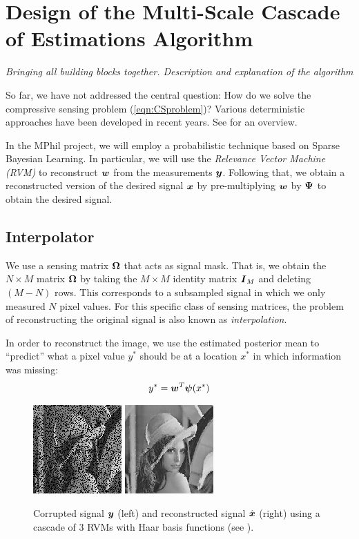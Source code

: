 \chapter{Design of the Multi-Scale Cascade of Estimations Algorithm}
\emph{Bringing all building blocks together. Description and explanation of the algorithm}



So far, we have not addressed the central question: How do we solve the compressive sensing problem (\ref{eqn:CSproblem})?
Various deterministic approaches have been developed in recent years.
See \cite{pilikos2014} for an overview.

In the MPhil project, we will employ a probabilistic technique based on Sparse Bayesian Learning.
In particular, we will use the \emph{Relevance Vector Machine (RVM)} \cite{tipping2001,tipping2003} to reconstruct $\boldsymbol w$ from the measurements $\boldsymbol y$.
Following that, we obtain a reconstructed version of the desired signal $\boldsymbol x$ by pre-multiplying $\boldsymbol w$ by $\boldsymbol \Psi$ to obtain the desired signal.



\section{Interpolator}
We use a sensing matrix $\boldsymbol\Omega$ that acts as signal mask. That is, we obtain the $N\times M$ matrix $\boldsymbol\Omega$ by taking the $M\times M$ identity matrix $\boldsymbol I_M$ and deleting $(M-N)$ rows. This corresponds to a subsampled signal in which we only measured $N$ pixel values. For this specific class of sensing matrices, the problem of reconstructing the original signal is also known as \emph{interpolation}.


In order to reconstruct the image, we use the estimated posterior mean to ``predict'' what a pixel value $y^*$ should be at a location $x^*$ in which information was missing:
\begin{equation}
y^* = \boldsymbol w^T\boldsymbol\psi(x^*)
\end{equation}

\begin{figure}
\center
\includegraphics{Images/0.png}
\includegraphics{Images/3.png}
\caption{Corrupted signal $\boldsymbol y$ (left) and reconstructed signal $\hat{\boldsymbol x}$ (right) using a cascade of 3 RVMs with Haar basis functions (see \cite{pilikos2014}).}
\label{fig:lennareconstruction}
\end{figure}

